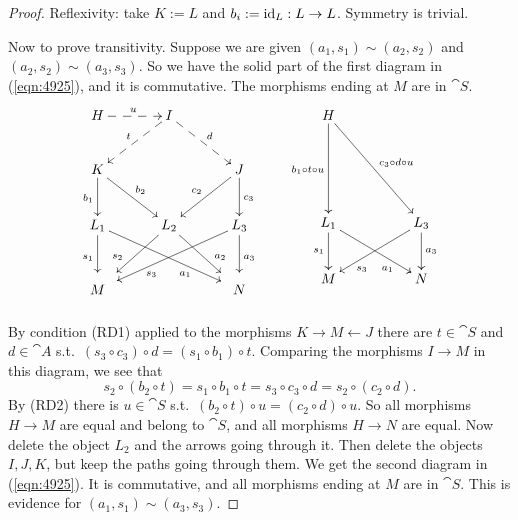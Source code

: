 \begin{proof}
Reflexivity: take $K := L$ and $b_i := \operatorname{id}_L : L \to L$. 
Symmetry is trivial. 

Now to prove transitivity. 
Suppose we are given 
$(a_1, s_1) \sim (a_2, s_2)$ and $(a_2, s_2) \sim (a_3, s_3)$.
So we have the solid part of the first diagram in (\ref{eqn:4925}),
and it is commutative. The morphisms ending at $M$ are in $\cat{S}$.
\begin{equation} \label{eqn:4925}
\UseTips  \xymatrix @C=6.5ex @R=6ex  {
H
\ar@{-->}[r]^{u}
&
I
\ar@{-->}[dl]_{t}
\ar@{-->}[dr]^{d}
\\
K
\ar[d]_{b_1}
\ar[dr]^{b_2}
& & 
J
\ar[dl]_{c_2}
\ar[d]^{c_3}
\\
L_1
\ar[d]_{s_1}
\ar[drr]_(0.65){a_1}
&
L_2
\ar[dl]_(0.6){s_2}
\ar[dr]^(0.6){a_2}
&
L_3
\ar[dll]^(0.65){s_3}
\ar[d]^{a_3}
\\
*+++{M} 
& &
*+++{N}
}
\qquad 
\UseTips  \xymatrix @C=5ex @R=6ex  {
H
\ar[dd]_{b_1 \circ t \circ u}
\ar[ddrr]^{c_3 \circ d \circ u}
\\
\rule{0pt}{0.5em}
\\
L_1
\ar[d]_{s_1}
\ar[drr]_(0.7){a_1}
&
&
L_3
\ar[dll]^(0.7){s_3}
\ar[d]^{a_3}
\\
*+{M}
& &
*+{N}
} 
\end{equation}
 
By condition (RD1) applied to the morphisms $K \to M \leftarrow J$ there are 
$t \in \cat{S}$ and $d \in \cat{A}$ s.t.\ 
$(s_3 \circ c_3) \circ d = (s_1 \circ b_1) \circ t$.
Comparing the morphisms $I \to M$ in this diagram, we see that  
\[ s_2 \circ (b_2 \circ t) = s_1 \circ b_1 \circ t = s_3 \circ c_3 \circ d =
s_2 \circ (c_2 \circ d) . \]
By (RD2) there is $u \in \cat{S}$ s.t.\ 
$(b_2 \circ t) \circ u = (c_2 \circ d) \circ u$.
So all morphisms $H \to M$ are equal and belong to $\cat{S}$, and  all 
morphisms $H \to N$ are equal.
Now delete the object $L_2$ and the arrows going through it. 
Then delete the objects $I, J, K$,  but keep the paths going through them. 
We get the second diagram in (\ref{eqn:4925}). It is commutative, and all
morphisms ending at $M$ are in $\cat{S}$. This is evidence for 
$(a_1, s_1) \sim (a_3, s_3)$.
\end{proof}

